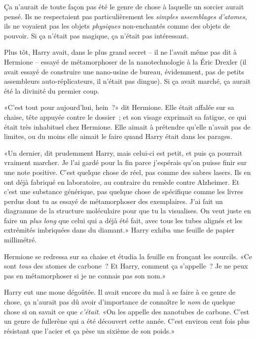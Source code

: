 Ça n'aurait de toute façon pas été le genre de chose à laquelle un sorcier aurait pensé. Ils ne respectaient pas particulièrement les \emph{simples assemblages d'atomes}, ils ne voyaient pas les objets \emph{physiques} non-enchantés comme des objets de pouvoir. Si ça n'était pas magique, ça n'était pas intéressant.

Plus tôt, Harry avait, dans le plus grand secret -- il ne l'avait même pas dit à Hermione -- essayé de métamorphoser de la nanotechnologie à la Éric Drexler (il avait essayé de construire une nano-usine de bureau, évidemment, pas de petits assembleurs auto-réplicateurs, il n'était pas dingue). Si ça avait marché, ça aurait été la divinité du premier coup.

«C'est tout pour aujourd'hui, hein~?» dit Hermione. Elle était affalée sur sa chaise, tête appuyée contre le dossier~; et son visage exprimait sa fatigue, ce qui était très inhabituel chez Hermione. Elle aimait à prétendre qu'elle n'avait pas de limites, ou du moins elle aimait le faire quand Harry était dans les parages.

«Un dernier, dit prudemment Harry, mais celui-ci est petit, et puis ça pourrait vraiment marcher. Je l'ai gardé pour la fin parce j'espérais qu'on puisse finir sur une note positive. C'est quelque chose de réel, pas comme des sabres lasers. Ils en ont déjà fabriqué en laboratoire, au contraire du remède contre Alzheimer. Et c'est une substance générique, pas quelque chose de spécifique comme les livres perdus dont tu as essayé de métamorphoser des exemplaires. J'ai fait un diagramme de la structure moléculaire pour que tu la visualises. On veut juste en faire un \emph{plus long} que celui qui a déjà été fait, avec tous les tubes alignés et les extrémités imbriquées dans du diamant.» Harry exhiba une feuille de papier millimétré.

Hermione se redressa sur sa chaise et étudia la feuille en fronçant les sourcils. «Ce sont \emph{tous} des atomes de carbone~? Et Harry, comment ça s'appelle~? Je ne peux pas en métamorphoser si je ne connais pas son nom.»

Harry eut une moue dégoûtée. Il avait encore du mal à se faire à ce genre de chose, ça n'aurait pas dû avoir d'importance de connaître le \emph{nom} de quelque chose si on savait ce que \emph{c'était}. «On les appelle des nanotubes de carbone. C'est un genre de fullerène qui a été découvert cette année. C'est environ cent fois plus résistant que l'acier et ça pèse un sixième de son poids.»

